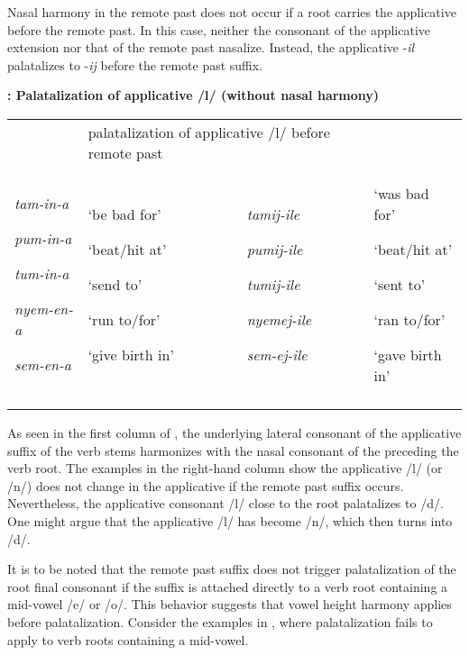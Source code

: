 \documentclass[output=paper]{langsci/langscibook}
\begin{document}
Nasal harmony in the remote past does not occur if a root carries the applicative before the remote past. In this case, neither the consonant of the applicative extension nor that of the remote past nasalize. Instead, the applicative -\emph{il} palatalizes to -\emph{ij} before the remote past suffix. 



\textbf{: Palatalization of applicative /l/ (without nasal harmony)  }


\begin{tabularx}{\textwidth}{XXXX}
\lsptoprule
\multicolumn{2}{l}{Root-applicative-FV } & \multicolumn{2}{l}{palatalization of applicative /l/ before remote past}\\
{\emph{tam-in-a}}

{\emph{pum-in-a}}

{\emph{tum-in-a}}

{\emph{nyem-en-a}}

\emph{sem-en-a} & {‘be bad for’}

{‘beat/hit at’}

{‘send to’}

{‘run to/for’}

‘give birth in’ & {\emph{tamij-ile}}

{\emph{pumij-ile}}

{\emph{tumij-ile}}

{\emph{nyemej-ile}}

\emph{sem-ej-ile} & {‘was bad for’}

{‘beat/hit at’}

{‘sent to’}

{‘ran to/for’}

‘gave birth in’\\
\lspbottomrule
\end{tabularx}
As seen in the first column of , the underlying lateral consonant of the applicative suffix of the verb stems harmonizes with the nasal consonant of the preceding the verb root. The examples in the right-hand column show the applicative /l/ (or /n/) does not change in the applicative if the remote past suffix occurs. Nevertheless, the applicative consonant /l/ close to the root palatalizes to /d/. One might argue that the applicative /l/ has become /n/, which then turns into /d/. 


It is to be noted that the remote past suffix does not trigger palatalization of the root final consonant if the suffix is attached directly to a verb root containing a mid-vowel /e/ or /o/. This behavior suggests that vowel height harmony applies before palatalization. Consider the examples in , where palatalization fails to apply to verb roots containing a mid-vowel. 
\end{document}
